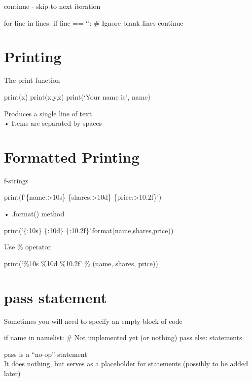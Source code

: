 \documentclass[
  letterpaper,
  DIV=11,
  numbers=noendperiod]{scrreprt}
\newenvironment{Shaded}{\begin{snugshade}}{\end{snugshade}}
\newcommand{\NormalTok}[1]{\textcolor[rgb]{0.00,0.23,0.31}{#1}}
\begin{document}
continue - skip to next iteration

for line in lines: if line == `\n': \# Ignore blank lines continue


\chapter{Printing}\label{printing}

The print function

print(x) print(x,y,z) print(`Your name is', name)

Produces a single line of text\\
• Items are separated by spaces


\chapter{Formatted Printing}\label{formatted-printing}

f-strings

print(f'\{name:\textgreater10s\} \{shares:\textgreater10d\}
\{price:\textgreater10.2f\}')

• .format() method

print(`\{:10s\} \{:10d\} \{:10.2f\}'.format(name,shares,price))

Use \% operator

print(`\%10s \%10d \%10.2f' \% (name, shares, price))


\chapter{pass statement}\label{pass-statement}

Sometimes you will need to specify an empty block of code

\begin{Shaded}
\begin{Highlighting}[]
\NormalTok{if name in namelist: \# Not implemented yet (or nothing) pass else: statements }
\end{Highlighting}
\end{Shaded}

pass is a ``no-op'' statement\\
It does nothing, but serves as a placeholder for statements (possibly to
be added later)

\end{document}
